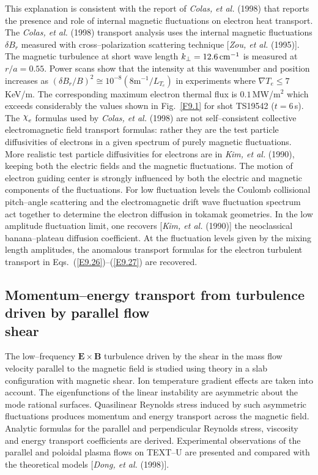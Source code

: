 \documentclass[a4paper,openany,12pt]{book}
\def\chix{\raise.5ex\hbox{$\chi$}}
\begin{document}
This explanation is consistent with the report of \emph{Colas, et al.} (1998) that reports the presence and role of internal magnetic fluctuations on electron heat transport. The \emph{Colas, et al.} (1998) transport analysis uses the internal magnetic fluctuations $\delta B_r$ measured with cross--polarization scattering technique [\emph{Zou, et al.} (1995)]. The magnetic turbulence at short wave length $k_\perp=12.6\,\rm cm^{-1}$ is measured at $r/a=0.55$. Power scans show that the intensity at this wavenumber and position increases as $(\delta B_r/B)^2\cong 10^{-8} (8\mathrm{m}^{-1}/L_{T_e})$ in experiments where $\nabla T_e\le 7\,$KeV/m. The corresponding maximum electron thermal flux is $0.1\,$MW/m$^2$ which exceeds considerably the values shown in Fig.~\ref{F9.1} for shot TS19542 ($t=6\,$s). The $\chix_e$ formulas used by \emph{Colas, et al.} (1998) are not self--consistent collective electromagnetic field transport formulas: rather they are the test particle diffusivities of electrons in a given spectrum of purely magnetic fluctuations. More realistic test particle diffusivities for electrons are in \emph{Kim, et al.} (1990), keeping both the electric fields and the magnetic fluctuations. The motion of electron guiding center is strongly influenced by both the electric and magnetic components of the fluctuations. For low fluctuation levels the Coulomb collisional pitch--angle scattering and the electromagnetic drift wave fluctuation spectrum act together to determine the electron diffusion in tokamak geometries. In the low amplitude fluctuation limit, one recovers [\emph{Kim, et al.} (1990)] the neoclassical banana--plateau diffusion coefficient. At the fluctuation levels given by the mixing length amplitudes, the anomalous transport formulas for the electron turbulent transport in Eqs.~(\ref{E9.26})--(\ref{E9.27}) are recovered.

\subsection*{Momentum--energy transport from turbulence driven by parallel flow\\ shear}

The low--frequency $\bm{E\times B}$ turbulence driven by the shear in the mass flow velocity parallel to the magnetic field is studied using theory in a slab configuration with magnetic shear. Ion temperature gradient effects are taken into account. The eigenfunctions of the linear instability are asymmetric about the mode rational surfaces. Quasilinear Reynolds stress induced by such asymmetric fluctuations produces momentum and energy transport across the magnetic field. Analytic formulas for the parallel and perpendicular Reynolds stress, viscosity and energy transport coefficients are derived. Experimental observations of the parallel and poloidal plasma flows on TEXT--U are presented and compared with the theoretical models [\emph{Dong, et al.} (1998)].
\end{document}
